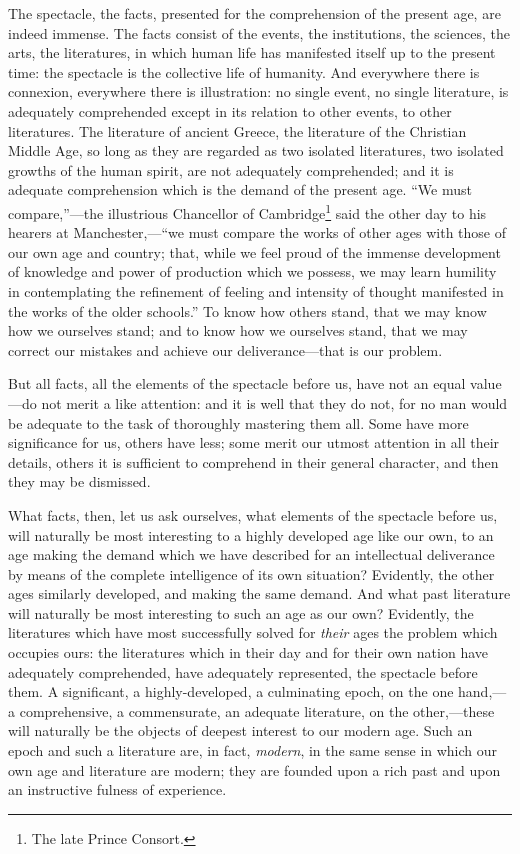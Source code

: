 The spectacle, the facts, presented for the comprehension of the present
age, are indeed immense. The facts consist of the events, the
institutions, the sciences, the arts, the literatures, in which human
life has manifested itself up to the present time: the spectacle is the
collective life of humanity. And everywhere there is connexion,
everywhere there is illustration: no single event, no single literature,
is adequately comprehended except in its relation to other events, to
other literatures. The literature of ancient Greece, the literature of
the Christian Middle Age, so long as they are regarded as two isolated
literatures, two isolated growths of the human spirit, are not
adequately comprehended; and it is adequate comprehension which is the
demand of the present age. ``We must compare,''---the illustrious
Chancellor of Cambridge\footnote{The late Prince Consort.} said the
other day to his hearers at Manchester,---``we must compare the works of
other ages with those of our own age and country; that, while we feel
proud of the immense development of knowledge and power of production
which we possess, we may learn humility in contemplating the refinement
of feeling and intensity of thought manifested in the works of the older
schools.'' To know how others stand, that we may know how we ourselves
stand; and to know how we ourselves stand, that we may correct our
mistakes and achieve our deliverance---that is our problem.

But all facts, all the elements of the spectacle before us, have not an
equal value---do not merit a like attention: and it is well that they do
not, for no man would be adequate to the task of thoroughly mastering
them all. Some have more significance for us, others have less; some
merit our utmost attention in all their details, others it is sufficient
to comprehend in their general character, and then they may be
dismissed.

What facts, then, let us ask ourselves, what elements of the spectacle
before us, will naturally be most interesting to a highly developed age
like our own, to an age making the demand which we have described for an
intellectual deliverance by means of the complete intelligence of its
own situation? Evidently, the other ages similarly developed, and making
the same demand. And what past literature will naturally be most
interesting to such an age as our own? Evidently, the literatures which
have most successfully solved for \emph{their} ages the problem which
occupies ours: the literatures which in their day and for their own
nation have adequately comprehended, have adequately represented, the
spectacle before them. A significant, a highly-developed, a culminating
epoch, on the one hand,---a comprehensive, a commensurate, an adequate
literature, on the other,---these will naturally be the objects of
deepest interest to our modern age. Such an epoch and such a literature
are, in fact, \emph{modern}, in the same sense in which our own age and
literature are modern; they are founded upon a rich past and upon an
instructive fulness of experience.

